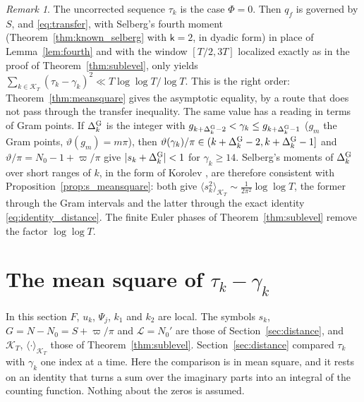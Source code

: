 \documentclass[11pt,a4paper]{article}
\makeatletter
\numberwithin{equation}{section}
\DeclareRobustCommand{\CGref}[1]{\ref{#1}}
\DeclareRobustCommand{\CGeqref}[1]{\eqref{#1}}
\DeclareRobustCommand{\CGcite}[2][]{\if\relax\detokenize{#1}\relax\cite{#2}\else\cite[#1]{#2}\fi}
\let\CG@origref\ref
\let\CG@origeqref\eqref
\newcommand{\CG@gettip}[1]{\@ifundefined{CGTip@#1}{#1}{\csname CGTip@#1\endcsname}}
\newcommand{\CG@getbib}[1]{\@ifundefined{CGBib@#1}{#1}{\csname CGBib@#1\endcsname}}
\DeclareRobustCommand{\CGref}[1]{\pdftooltip{\CG@origref{#1}}{\CG@gettip{#1}}}
\DeclareRobustCommand{\CGeqref}[1]{\pdftooltip{\CG@origeqref{#1}}{\CG@gettip{#1}}}
\DeclareRobustCommand{\CGcite}[2][]{\pdftooltip{\if\relax\detokenize{#1}\relax\cite{#2}\else\cite[#1]{#2}\fi}{\CG@getbib{#2}}}
\theoremstyle{definition}
\theoremstyle{remark}
\newtheorem{remark}[theorem]{Remark}
\newcommand{\Nz}{N_0} %
\newcommand{\lL}{\mathcal L}
\newcommand{\Ph}{\Phi}
\newcommand{\Kc}{\mathcal K}
\makeatother
\begin{document}
\begin{remark}\label{rem:bare_point}
The uncorrected sequence $\tau_k$ is the case $\Ph=0$. Then $q_f$ is governed by $S$, and \CGeqref{eq:transfer}, with Selberg's fourth moment (Theorem~\CGref{thm:known_selberg} with $\mathsf k=2$, in dyadic form) in place of Lemma~\CGref{lem:fourth} and with the window $[T/2,3T]$ localized exactly as in the proof of Theorem~\CGref{thm:sublevel}, only yields $\sum_{k\in\Kc_T}(\tau_k-\gamma_k)^2\ll T\log\log T/\log T$. This is the right order: Theorem~\CGref{thm:meansquare} gives the asymptotic equality, by a route that does not pass through the transfer inequality. The same value has a reading in terms of Gram points. If $\Delta^{\rm G}_k$ is the integer with $g_{k+\Delta^{\rm G}_k-2}<\gamma_k\le g_{k+\Delta^{\rm G}_k-1}$ ($g_m$ the Gram points, $\vartheta(g_m)=m\pi$), then $\vartheta(\gamma_k)/\pi\in(k+\Delta^{\rm G}_k-2,k+\Delta^{\rm G}_k-1]$ and $\vartheta/\pi=\Nz-1+\varpi/\pi$ give $|s_k+\Delta^{\rm G}_k|<1$ for $\gamma_k\ge14$. Selberg's moments of $\Delta^{\rm G}_k$ over short ranges of $k$, in the form of Korolev \CGcite[Thm.~4.2]{Korolev2012}, are therefore consistent with Proposition~\CGref{prop:s_meansquare}: both give $\langle s_k^2\rangle_{\Kc_T}\sim\frac1{2\pi^2}\log\log T$, the former through the Gram intervals and the latter through the exact identity \CGeqref{eq:identity_distance}. The finite Euler phases of Theorem~\CGref{thm:sublevel} remove the factor $\log\log T$.
\end{remark}

\section{The mean square of \texorpdfstring{$\tau_k-\gamma_k$}{tau\_k - gamma\_k}}\label{sec:meansquare}

In this section $F$, $u_k$, $\Psi_j$, $k_1$ and $k_2$ are local. The symbols $s_k$, $G=N-\Nz=S+\varpi/\pi$ and $\lL=\Nz'$ are those of Section~\CGref{sec:distance}, and $\Kc_T$, $\langle\cdot\rangle_{\Kc_T}$ those of Theorem~\CGref{thm:sublevel}. Section~\CGref{sec:distance} compared $\tau_k$ with $\gamma_k$ one index at a time. Here the comparison is in mean square, and it rests on an identity that turns a sum over the imaginary parts into an integral of the counting function. Nothing about the zeros is assumed.
\end{document}
